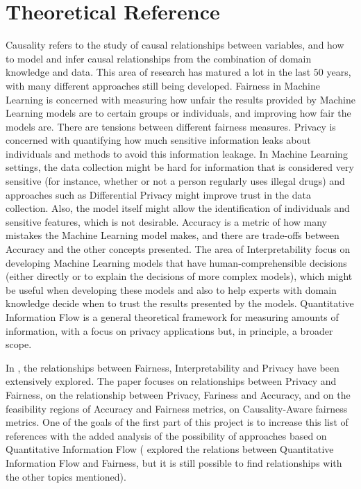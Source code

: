 \documentclass{article}
\begin{document}
\section{Theoretical Reference}

Causality refers to the study of causal relationships between variables, and how to model and infer causal relationships from the combination of domain knowledge and data\cite{Causality}. This area of research has matured a lot in the last $50$ years, with many different approaches still being developed. Fairness in Machine Learning is concerned with measuring how unfair the results provided by Machine Learning models are to certain groups or individuals\cite{FairMeasures}, and improving how fair the models are\cite{FairSolve}. There are tensions between different fairness measures\cite{Impossibility}\cite{FairTensions}. Privacy is concerned with quantifying how much sensitive information leaks about individuals and methods to avoid this information leakage. In Machine Learning settings, the data collection might be hard for information that is considered very sensitive (for instance, whether or not a person regularly uses illegal drugs) and approaches such as Differential Privacy\cite{DP} might improve trust in the data collection. Also, the model itself might allow the identification of individuals and sensitive features, which is not desirable\cite{PrivacyML}. Accuracy is a metric of how many mistakes the Machine Learning model makes, and there are trade-offs between Accuracy and the other concepts presented\cite{Sok}\cite{Carlos}\cite{Rachel}. The area of Interpretability focus on developing Machine Learning models that have human-comprehensible decisions (either directly or to explain the decisions of more complex models), which might be useful when developing these models\cite{ExplDev} and also to help experts with domain knowledge decide when to trust the results presented by the models\cite{ExplainExperts}. Quantitative Information Flow is a general theoretical framework for measuring amounts of information, with a focus on privacy applications but, in principle, a broader scope\cite{QIF}.

In \cite{Sok}, the relationships between Fairness, Interpretability and Privacy have been extensively explored. The paper \cite{Awareness} focuses on relationships between Privacy and Fairness, \cite{Rachel} on the relationship between Privacy, Fariness and Accuracy, \cite{Carlos} and \cite{Reductions} on the feasibility regions of Accuracy and Fairness metrics, \cite{CausalFair} on Causality-Aware fairness metrics. One of the goals of the first part of this project is to increase this list of references with the added analysis of the possibility of approaches based on Quantitative Information Flow (\cite{Bruno} explored the relations between Quantitative Information Flow and Fairness, but it is still possible to find relationships with the other topics mentioned).
\end{document}
